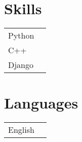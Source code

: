 \documentclass[a4paper,10pt]{article}
\begin{document}
\begin{adjustbox}{valign=t}
\begin{minipage}{0.6\textwidth}
	
	 

\MySkip
\begin{multicols}{2}
\section*{Skills}
\begin{tabular}{ll}
	Python  			& \SkillBull{$\bullet \bullet \circ \, \circ$}\\
	C++ 		& \SkillBull{$\bullet \bullet \circ \, \circ$}\\
    Django 		& \SkillBull{$\bullet \circ \circ \, \circ$}\\
\end{tabular}

\vfill\null \columnbreak  %

\section*{Languages}
\begin{tabular}{ll}
	English 		& \SkillBull{$\bullet \bullet \circ \, \circ$}\\
\end{tabular}
\end{multicols}
\LastUpdate
\end{minipage}
\end{adjustbox}
\end{document}
